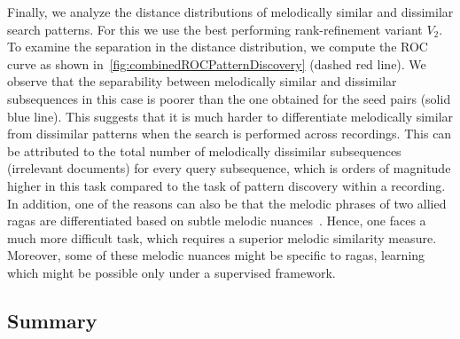 Finally, we analyze the distance distributions of melodically similar and dissimilar search patterns. For this we use the best performing rank-refinement variant $V_2$. To examine the separation in the distance distribution, we compute the ROC curve as shown in~\ref{fig:combinedROCPatternDiscovery} (dashed red line). We observe that the separability between melodically similar and dissimilar subsequences in this case is poorer than the one obtained for the seed pairs (solid blue line). This suggests that it is much harder to differentiate melodically similar from dissimilar patterns when the search is performed across recordings. This can be attributed to the total number of melodically dissimilar subsequences (irrelevant documents) for every query subsequence, which is orders of magnitude higher in this task compared to the task of pattern discovery within a recording. In addition, one of the reasons can also be that the melodic phrases of two allied \glspl{raga}  are differentiated based on subtle melodic nuances~\cite{Viswanathan2004}. Hence, one faces a much more difficult task, which requires a superior melodic similarity measure. Moreover, some of these melodic nuances might be specific to \glspl{raga}, learning which might be possible only under a supervised framework. 



\subsection{Summary}
\label{sec:patterns_pattern_discovery_summary}

